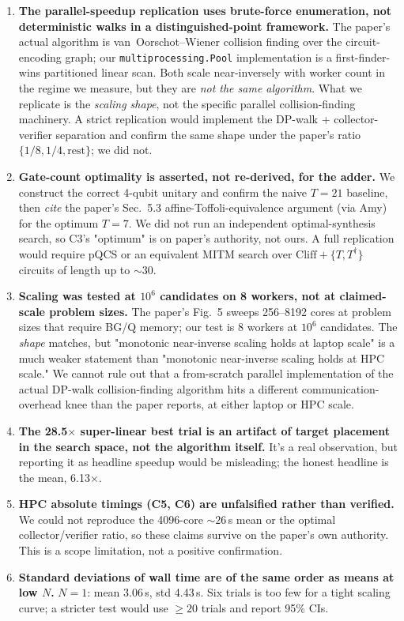 \documentclass[11pt]{article}
\begin{document}
\begin{enumerate}
\item \textbf{The parallel-speedup replication uses brute-force
enumeration, not deterministic walks in a distinguished-point
framework.} The paper's actual algorithm is van~Oorschot--Wiener
collision finding over the circuit-encoding graph; our
\texttt{multiprocessing.Pool} implementation is a first-finder-wins
partitioned linear scan. Both scale near-inversely with worker count in
the regime we measure, but they are \emph{not the same algorithm}. What
we replicate is the \emph{scaling shape}, not the specific parallel
collision-finding machinery. A strict replication would implement the
DP-walk + collector-verifier separation and confirm the same shape
under the paper's ratio $\{1/8, 1/4, \text{rest}\}$; we did not.

\item \textbf{Gate-count optimality is asserted, not re-derived, for the
adder.} We construct the correct 4-qubit unitary and confirm the naive
$T{=}21$ baseline, then \emph{cite} the paper's Sec.~5.3
affine-Toffoli-equivalence argument (via Amy) for the optimum $T{=}7$.
We did not run an independent optimal-synthesis search, so C3's
"optimum" is on paper's authority, not ours. A full replication would
require pQCS or an equivalent MITM search over
$\text{Cliff}+\{T,T^\dagger\}$ circuits of length up to $\sim\!30$.

\item \textbf{Scaling was tested at $10^6$ candidates on 8 workers, not
at claimed-scale problem sizes.} The paper's Fig.~5 sweeps 256--8192
cores at problem sizes that require BG/Q memory; our test is 8 workers
at $10^6$ candidates. The \emph{shape} matches, but "monotonic
near-inverse scaling holds at laptop scale" is a much weaker
statement than "monotonic near-inverse scaling holds at HPC scale." We
cannot rule out that a from-scratch parallel implementation of the
actual DP-walk collision-finding algorithm hits a different
communication-overhead knee than the paper reports, at either laptop
or HPC scale.

\item \textbf{The 28.5$\times$ super-linear best trial is an artifact
of target placement in the search space, not the algorithm itself.}
It's a real observation, but reporting it as headline speedup would be
misleading; the honest headline is the mean, 6.13$\times$.

\item \textbf{HPC absolute timings (C5, C6) are unfalsified rather than
verified.} We could not reproduce the 4096-core $\sim\!26$\,s mean or
the optimal collector/verifier ratio, so these claims survive on the
paper's own authority. This is a scope limitation, not a positive
confirmation.

\item \textbf{Standard deviations of wall time are of the same order as
means at low $N$.} $N{=}1$: mean 3.06\,s, std 4.43\,s. Six trials is
too few for a tight scaling curve; a stricter test would use
$\ge\!20$ trials and report 95\% CIs.
\end{enumerate}
\end{document}
